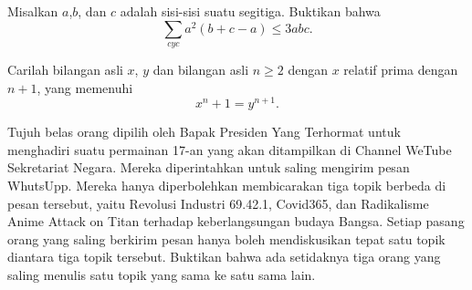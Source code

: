 \documentclass[11pt]{scrartcl}
\begin{document}
	\begin{soalbaru}
	Misalkan $a$,$b$, dan $c$ adalah sisi-sisi suatu segitiga. Buktikan bahwa$$\sum_{cyc} a^2(b+c-a) \le 3abc.$$
	\end{soalbaru}
	
	\begin{soalbaru}
	Carilah bilangan asli $x$, $y$ dan bilangan asli $n \ge 2$ dengan $x$ relatif prima dengan $n+1$, yang memenuhi $$x^n+1=y^{n+1}.$$
	\end{soalbaru}
	
	\begin{soalbaru}
	Tujuh belas orang dipilih oleh Bapak Presiden Yang Terhormat untuk menghadiri suatu permainan 17-an yang akan ditampilkan di Channel WeTube Sekretariat Negara. Mereka diperintahkan untuk saling mengirim pesan WhutsUpp. Mereka hanya diperbolehkan membicarakan tiga topik berbeda di pesan tersebut, yaitu Revolusi Industri 69.42.1, Covid365, dan Radikalisme Anime Attack on Titan terhadap keberlangsungan budaya Bangsa. Setiap pasang orang yang saling berkirim pesan hanya boleh mendiskusikan tepat satu topik diantara tiga topik tersebut. Buktikan bahwa ada setidaknya tiga orang yang saling menulis satu topik yang sama ke satu sama lain.
	\end{soalbaru}
\end{document}
